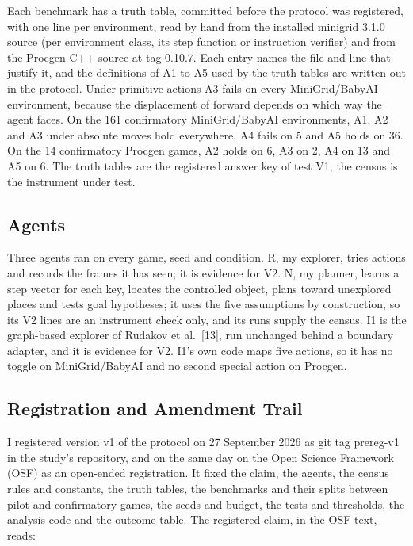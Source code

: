 \documentclass[journal]{IEEEtran}
\begin{document}
Each benchmark has a truth table, committed before the protocol was
registered, with one line per environment, read by hand from the
installed minigrid 3.1.0 source (per environment class, its step
function or instruction verifier) and from the Procgen C++ source at tag
0.10.7. Each entry names the file and line that justify it, and the
definitions of A1 to A5 used by the truth tables are written out in the
protocol. Under primitive actions A3 fails on every MiniGrid/BabyAI
environment, because the displacement of forward depends on which way
the agent faces. On the 161 confirmatory MiniGrid/BabyAI environments,
A1, A2 and A3 under absolute moves hold everywhere, A4 fails on 5 and A5
holds on 36. On the 14 confirmatory Procgen games, A2 holds on 6, A3 on
2, A4 on 13 and A5 on 6. The truth tables are the registered answer key
of test V1; the census is the instrument under test.

\subsection{Agents}\label{agents}

Three agents ran on every game, seed and condition. R, my explorer,
tries actions and records the frames it has seen; it is evidence for V2.
N, my planner, learns a step vector for each key, locates the controlled
object, plans toward unexplored places and tests goal hypotheses; it
uses the five assumptions by construction, so its V2 lines are an
instrument check only, and its runs supply the census. I1 is the
graph-based explorer of Rudakov et al.~{[}13{]}, run unchanged behind a
boundary adapter, and it is evidence for V2. I1's own code maps five
actions, so it has no toggle on MiniGrid/BabyAI and no second special
action on Procgen.

\subsection{Registration and Amendment
Trail}\label{registration-and-amendment-trail}

I registered version v1 of the protocol on 27 September 2026 as git tag
prereg-v1 in the study's repository, and on the same day on the Open
Science Framework (OSF) as an open-ended registration. It fixed the
claim, the agents, the census rules and constants, the truth tables, the
benchmarks and their splits between pilot and confirmatory games, the
seeds and budget, the tests and thresholds, the analysis code and the
outcome table. The registered claim, in the OSF text, reads:
\end{document}
